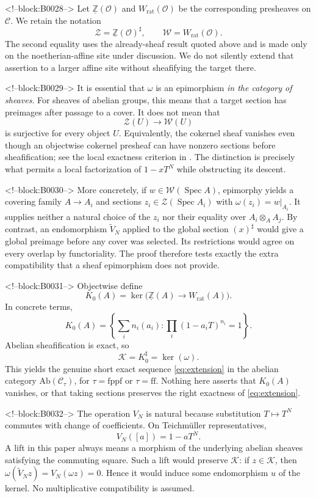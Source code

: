 \documentclass[11pt]{article}
\theoremstyle{definition}
\newcommand{\Spec}{\operatorname{Spec}}
\newcommand{\Wrat}{W_{\mathrm{rat}}}
\newcommand{\Zpre}{\underline{\mathbb Z}}
\newcommand{\Zsh}{\mathcal Z}
\newcommand{\Wsh}{\mathcal W}
\newcommand{\Ksh}{\mathcal K}
\newcommand{\sh}{\sharp}
\newcommand{\ff}{\mathrm{ff}}
\newcommand{\fppf}{\mathrm{fppf}}
\begin{document}
<!--block:B0028-->
Let \(\Zpre(\mathcal O)\) and \(\Wrat(\mathcal O)\) be the corresponding
presheaves on \(\mathscr C\).  We retain the notation
\[
 \Zsh=\Zpre(\mathcal O)^\sh,\qquad
 \Wsh=\Wrat(\mathcal O).
\]
The second equality uses the already-sheaf result quoted above and is made
only on the noetherian-affine site under discussion.  We do not silently
extend that assertion to a larger affine site without sheafifying the
target there.

<!--block:B0029-->
It is essential that \(\omega\) is an epimorphism \emph{in the category of
sheaves}.  For sheaves of abelian groups, this means that a target section
has preimages after passage to a cover.  It does not mean that
\[
 \Zsh(U)\longrightarrow\Wsh(U)
\]
is surjective for every object \(U\).  Equivalently, the cokernel sheaf
vanishes even though an objectwise cokernel presheaf can have nonzero
sections before sheafification; see the local exactness criterion in
\cite[Tag 03CN]{StacksProject}.  The distinction is precisely what permits
a local factorization of \(1-xT^N\) while obstructing its descent.

<!--block:B0030-->
More concretely, if \(w\in\Wsh(\Spec A)\), epimorphy yields a covering
family \(A\to A_i\) and sections \(z_i\in\Zsh(\Spec A_i)\) with
\(\omega(z_i)=w|_{A_i}\).  It supplies neither a natural choice of the
\(z_i\) nor their equality over \(A_i\otimes_A A_j\).  By contrast, an
endomorphism \(\widetilde V_N\) applied to the global section
\((x)^\sh\) would give a global preimage before any cover was selected.
Its restrictions would agree on every overlap by functoriality.  The proof
therefore tests exactly the extra compatibility that a sheaf epimorphism
does not provide.

<!--block:B0031-->
Objectwise define
\[
 K_0(A)=\ker\bigl(\Zpre(A)\longrightarrow\Wrat(A)\bigr).
\]
In concrete terms,
\[
 K_0(A)=
 \left\{\sum_i n_i(a_i):
   \prod_i(1-a_iT)^{n_i}=1\right\}.
 \tag{2.2}\label{eq:kernel}
\]
Abelian sheafification is exact, so
\[
 \Ksh=K_0^\sh=\ker(\omega).
\]
This yields the genuine short exact sequence \eqref{eq:extension} in the
abelian category \(\mathrm{Ab}(\mathscr C_\tau)\), for
\(\tau=\fppf\) or \(\tau=\ff\).  Nothing here asserts that
\(K_0(A)\) vanishes, or that taking sections preserves the right exactness
of \eqref{eq:extension}.

<!--block:B0032-->
The operation \(V_N\) is natural because substitution \(T\mapsto T^N\)
commutes with change of coefficients.  On Teichm\"uller representatives,
\[
 V_N([a])=1-aT^N.
 \tag{2.3}\label{eq:versch}
\]
A lift in this paper always means a morphism of the underlying abelian
sheaves satisfying the commuting square.  Such a lift would preserve
\(\Ksh\): if \(z\in\Ksh\), then
\(\omega(\widetilde V_Nz)=V_N(\omega z)=0\).  Hence it would induce some
endomorphism \(u\) of the kernel.  No multiplicative compatibility is
assumed.
\end{document}
